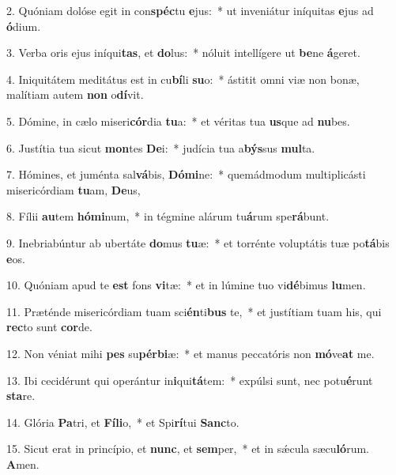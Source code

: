 2. Quóniam dolóse egit in con\textbf{spéc}tu \textbf{e}jus:~*  ut inveniátur iníquitas \textbf{e}jus ad \textbf{ó}dium.\

3. Verba oris ejus iníqui\textbf{tas}, et \textbf{do}lus:~*  nóluit intellígere ut \textbf{be}ne \textbf{á}geret.\

4. Iniquitátem meditátus est in cu\textbf{bí}li \textbf{su}o:~*  ástitit omni viæ non bonæ, malítiam autem \textbf{non} o\textbf{dí}vit.\

5. Dómine, in cælo miseri\textbf{cór}dia \textbf{tu}a:~*  et véritas tua \textbf{us}que ad \textbf{nu}bes.\

6. Justítia tua sicut \textbf{mon}tes \textbf{De}i:~*  judícia tua a\textbf{býs}sus \textbf{mul}ta.\

7. Hómines, et juménta sal\textbf{vá}bis, \textbf{Dó}\textbf{mi}ne:~*  quemádmodum multiplicásti misericórdiam \textbf{tu}am, \textbf{De}us,\

8. Fílii \textbf{au}tem \textbf{hó}\textbf{mi}num,~*  in tégmine alárum tu\textbf{á}rum spe\textbf{rá}bunt.\

9. Inebriabúntur ab ubertáte \textbf{do}mus \textbf{tu}æ:~*  et torrénte voluptátis tuæ po\textbf{tá}bis \textbf{e}os.\

10. Quóniam apud te \textbf{est} fons \textbf{vi}tæ:~*  et in lúmine tuo vi\textbf{dé}bimus \textbf{lu}men.\

11. Præténde misericórdiam tuam sci\textbf{én}ti\textbf{bus} te,~*  et justítiam tuam his, qui \textbf{rec}to sunt \textbf{cor}de.\

12. Non véniat mihi \textbf{pes} su\textbf{pér}\textbf{bi}æ:~*  et manus peccatóris non \textbf{mó}ve\textbf{at} me.\

13. Ibi cecidérunt qui operántur in\textbf{i}qui\textbf{tá}tem:~*  expúlsi sunt, nec potu\textbf{é}runt \textbf{sta}re.\

14. Glória \textbf{Pa}tri, et \textbf{Fí}\textbf{li}o,~*  et Spi\textbf{rí}tui \textbf{Sanc}to.\

15. Sicut erat in princípio, et \textbf{nunc}, et \textbf{sem}per,~*  et in sǽcula sæcu\textbf{ló}rum. \textbf{A}men.\

